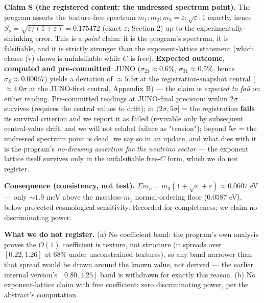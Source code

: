 \documentclass[11pt]{article}
\begin{document}
\textbf{Claim S (the registered content: the undressed spectrum point).} The program asserts the texture-free spectrum $m_1 : m_2 : m_3 = \varepsilon : \sqrt\varepsilon : 1$ exactly, hence $S_\nu = \sqrt{\varepsilon/(1+\varepsilon)} = 0.175472$ (exact $\varepsilon$; Section 2) up to the experimentally-shrinking error.  This is a \emph{point} claim: it is the program's spectrum, it is falsifiable, and it is strictly stronger than the exponent-lattice statement (which clause (v) shows is unfalsifiable while $C$ is free).  \textbf{Expected outcome, computed and pre-committed}: JUNO ($\sigma_{21} \approx 0.6\%$, $\sigma_{31} \approx 0.5\%$, hence $\sigma_S \approx 0.00067$) yields a deviation of $\approx 5.5\sigma$ at the registration-snapshot central ($\approx 4.0\sigma$ at the JUNO-first central, Appendix B) — the claim is \emph{expected to fail} on either reading.  Pre-committed readings at JUNO-final precision: within $2\sigma$ = survives (requires the central values to drift); in $(2\sigma, 5\sigma]$ = the registration \textbf{fails} its survival criterion and we report it as failed (revivable only by subsequent central-value drift, and we will not relabel failure as "tension"); beyond $5\sigma$ = the undressed spectrum point is dead, we say so in an update, and what dies with it is the program's \emph{no-dressing assertion for the neutrino sector} — the exponent lattice itself survives only in the unfalsifiable free-$C$ form, which we do not register.

\textbf{Consequence (consistency, not test).}  $\Sigma m_\nu = m_3(1 + \sqrt\varepsilon + \varepsilon) \approx 0.0607$ eV — only $\sim 1.9$ meV above the massless-$m_1$ normal-ordering floor ($0.0587$ eV), below projected cosmological sensitivity.  Recorded for completeness; we claim no discriminating power.

\textbf{What we do not register.}  (a) No coefficient band: the program's own analysis proves the $O(1)$ coefficient is texture, not structure (it spreads over $[0.22, 1.26]$ at $68\%$ under unconstrained textures), so any band narrower than that spread would be drawn around the known value, not derived — the earlier internal version's $[0.80, 1.25]$ band is withdrawn for exactly this reason.  (b) No exponent-lattice claim with free coefficient: zero discriminating power, per the abstract's computation.
\end{document}
